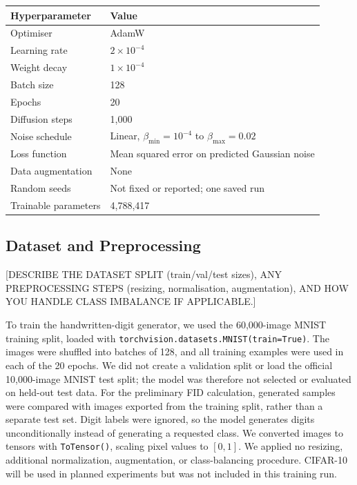 \documentclass[11pt, letterpaper]{article}
\begin{document}
\begin{center}
\begin{tabular}{ll}
\toprule
\textbf{Hyperparameter} & \textbf{Value} \\
\midrule
Optimiser & AdamW \\
Learning rate & $2\times10^{-4}$ \\
Weight decay & $1\times10^{-4}$ \\
Batch size & 128 \\
Epochs & 20 \\
Diffusion steps & 1,000 \\
Noise schedule & Linear, $\beta_{\min}=10^{-4}$ to $\beta_{\max}=0.02$ \\
Loss function & Mean squared error on predicted Gaussian noise \\
Data augmentation & None \\
Random seeds & Not fixed or reported; one saved run \\
Trainable parameters & 4,788,417 \\
\bottomrule
\end{tabular}
\end{center}

\subsection{Dataset and Preprocessing}

[DESCRIBE THE DATASET SPLIT (train/val/test sizes), ANY PREPROCESSING STEPS
(resizing, normalisation, augmentation), AND HOW YOU HANDLE CLASS IMBALANCE
IF APPLICABLE.]

To train the handwritten-digit generator, we used the 60,000-image MNIST training split, loaded with \texttt{torchvision.datasets.MNIST(train=True)}. The images were shuffled into batches of 128, and all training examples were used in each of the 20 epochs. We did not create a validation split or load the official 10,000-image MNIST test split; the model was therefore not selected or evaluated on held-out test data. For the preliminary FID calculation, generated samples were compared with images exported from the training split, rather than a separate test set. Digit labels were ignored, so the model generates digits unconditionally instead of generating a requested class. We converted images to tensors with \texttt{ToTensor()}, scaling pixel values to $[0,1]$. We applied no resizing, additional normalization, augmentation, or class-balancing procedure. CIFAR-10 will be used in planned experiments but was not included in this training run.
\end{document}
